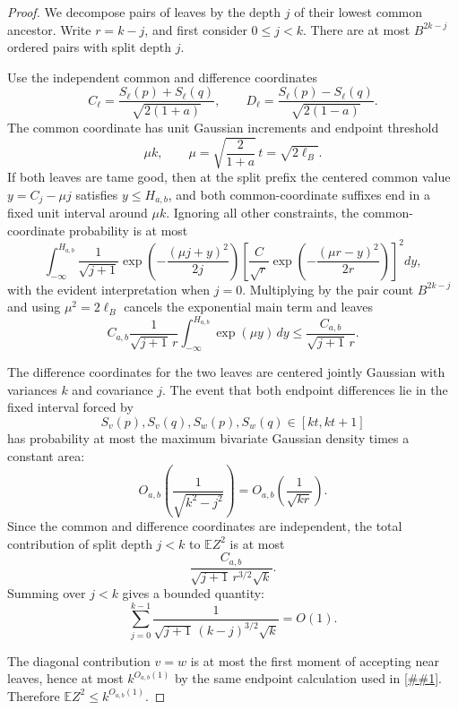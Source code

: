 \documentclass[10pt]{article}
\newcommand{\cref}[1]{\ref{##1}}
\theoremstyle{definition}
\newcommand{\E}{\mathbb{E}}
\begin{document}
\begin{proof}
   We decompose pairs of leaves by the depth $j$ of their lowest common ancestor. Write $r=k-j$, and first consider $0\le j<k$. There are at most $B^{2k-j}$ ordered pairs with split depth $j$.

   Use the independent common and difference coordinates
   \[
      C_\ell=\frac{S_\ell(p)+S_\ell(q)}{\sqrt{2(1+a)}},
      \qquad
      D_\ell=\frac{S_\ell(p)-S_\ell(q)}{\sqrt{2(1-a)}}.
   \]
   The common coordinate has unit Gaussian increments and endpoint threshold
   \[
      \mu k,
      \qquad
      \mu=\sqrt{\frac{2}{1+a}}\,t=\sqrt{2\ell_B}.
   \]
   If both leaves are tame good, then at the split prefix the centered common value $y=C_j-\mu j$ satisfies $y\le H_{a,b}$, and both common-coordinate suffixes end in a fixed unit interval around $\mu k$. Ignoring all other constraints, the common-coordinate probability is at most
   \[
      \int_{-\infty}^{H_{a,b}}
      \frac{1}{\sqrt{j+1}}
      \exp\!\left(-\frac{(\mu j+y)^2}{2j}\right)
      \left[
         \frac{C}{\sqrt r}
         \exp\!\left(-\frac{(\mu r-y)^2}{2r}\right)
      \right]^2dy,
   \]
   with the evident interpretation when $j=0$. Multiplying by the pair count $B^{2k-j}$ and using $\mu^2=2\ell_B$ cancels the exponential main term and leaves
   \[
      C_{a,b}\frac{1}{\sqrt{j+1}\,r}
      \int_{-\infty}^{H_{a,b}}\exp(\mu y)\,dy
      \le
      \frac{C_{a,b}}{\sqrt{j+1}\,r}.
   \]

   The difference coordinates for the two leaves are centered jointly Gaussian with variances $k$ and covariance $j$. The event that both endpoint differences lie in the fixed interval forced by
   \[
      S_v(p),S_v(q),S_w(p),S_w(q)\in[kt,kt+1]
   \]
   has probability at most the maximum bivariate Gaussian density times a constant area:
   \[
      O_{a,b}\!\left(\frac{1}{\sqrt{k^2-j^2}}\right)
      =
      O_{a,b}\!\left(\frac{1}{\sqrt{kr}}\right).
   \]
   Since the common and difference coordinates are independent, the total contribution of split depth $j<k$ to $\E Z^2$ is at most
   \[
      \frac{C_{a,b}}{\sqrt{j+1}\,r^{3/2}\sqrt k}.
   \]
   Summing over $j<k$ gives a bounded quantity:
   \[
      \sum_{j=0}^{k-1}
      \frac{1}{\sqrt{j+1}\,(k-j)^{3/2}\sqrt k}
      =
      O(1).
   \]

   The diagonal contribution $v=w$ is at most the first moment of accepting near leaves, hence at most $k^{O_{a,b}(1)}$ by the same endpoint calculation used in \cref{lem:good-first-moment}. Therefore $\E Z^2\le k^{O_{a,b}(1)}$.
\end{proof}
\end{document}
